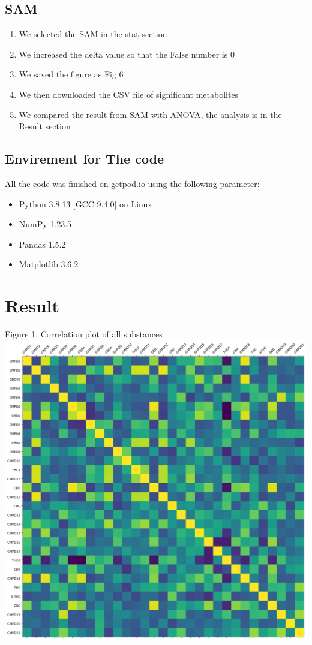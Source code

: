 \documentclass{article}
\begin{document}
\subsection*{SAM}
\begin{enumerate}
    \item We selected the SAM in the stat section
    \item We increased the delta value so that the False number is 0
    \item We saved the figure as Fig 6
    \item We then downloaded the CSV file of significant metabolites
    \item We compared the result from SAM with ANOVA, the analysis is in the Result section
\end{enumerate}

\subsection*{Envirement for The code} 
All the code was finished on getpod.io using the following parameter:
\begin{itemize}
    \item Python 3.8.13 [GCC 9.4.0] on Linux
    \item NumPy 1.23.5
    \item Pandas 1.5.2
    \item Matplotlib 3.6.2
\end{itemize}

\section{Result}

Figure 1. Correlation plot of all substances
\centering
\includegraphics[width=\textwidth]{output.png}
\end{document}
